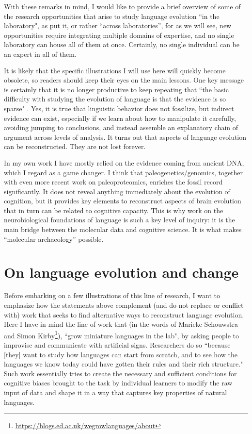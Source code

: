 With these remarks in mind, I would like to provide a brief overview of some of the research opportunities that arise to study language evolution ``in the laboratory", as \cite{scott2010language} put it, or rather ``across laboratories'', for as we will see, new opportunities require integrating multiple domains of expertise, and no single laboratory can house all of them at once. Certainly, no single individual can be an expert in all of them.

It is likely that the specific illustrations I will use here will quickly become obsolete, so readers should keep their eyes on the main lessons. One key message is certainly that it is no longer productive to keep repeating that ``the basic difficulty with studying the evolution of language is that the evidence is so sparse" \citep{jackendoff2006did}. Yes, it is true that linguistic behavior does not fossilize, but indirect evidence can exist, especially if we learn about how to manipulate it carefully, avoiding jumping to conclusions, and instead assemble an explanatory chain of argument across levels of analysis. It turns out that aspects of language evolution can be reconstructed. They are not lost forever.

In my own work I have mostly relied on the evidence coming from ancient DNA, which I regard as a game changer. I think that paleogenetics/genomics, together with even more recent work on paleoproteomics, enriches the fossil record significantly. It does not reveal anything immediately about the evolution of cognition, but it provides key elements to reconstruct aspects of brain evolution that in turn can be related to cognitive capacity. This is why work on the neurobiological foundations of language is such a key level of inquiry: it is the main bridge between the molecular data and cognitive science. It is what makes ``molecular archaeology'' \citep{paabo2014human} possible.

\section{On language evolution and change}

Before embarking on a few illustrations of this line of research, I want to emphasize how the statements above complement (and do not replace or conflict with) work that seeks to find alternative ways to reconstruct language evolution. Here I have in mind the line of work that (in the words of Marieke Schouwstra and Simon Kirby\footnote{\url{https://blogs.ed.ac.uk/wegrowlanguages/about}}), ``grow miniature languages in the lab", by asking people to improvise and communicate with artificial signs. Researchers do so ``because [they] want to study how languages can start from scratch, and to see how the languages we know today could have gotten their rules and their rich structure." Such work essentially tries to create the necessary and sufficient conditions for cognitive biases brought to the task by individual learners to modify the raw input of data and shape it in a way that captures key properties of natural languages.


